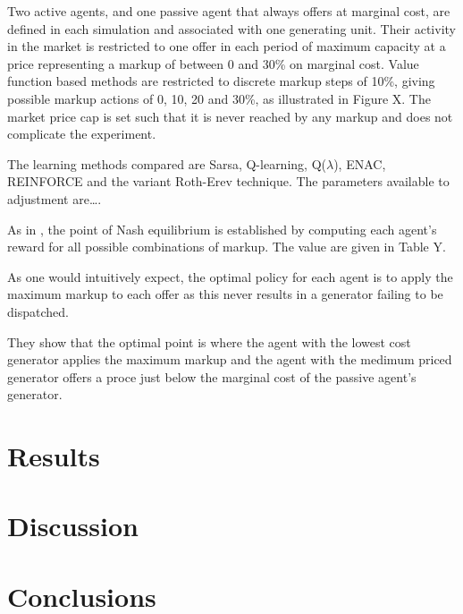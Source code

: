 Two active agents, and one passive agent that always offers at marginal cost,
are defined in each simulation and associated with one generating unit.  Their
activity in the market is restricted to one offer in each period of maximum
capacity at a price representing a markup of between 0 and 30\% on marginal
cost.  Value function based methods are restricted to discrete markup steps of
10\%, giving possible markup actions of 0, 10, 20 and 30\%, as illustrated in
Figure X.  The market price cap is set such that it is never reached by any
markup and does not complicate the experiment.

The learning methods compared are Sarsa, Q-learning, Q($\lambda$), ENAC,
REINFORCE and the variant Roth-Erev technique.  The parameters available to
adjustment are\ldots.

As in , the point of Nash equilibrium is established by
computing each agent's reward for all possible combinations of markup.  The
value are given in Table Y.

As one would intuitively expect, the optimal policy for each agent is to apply
the maximum markup to each offer as this never results in a generator failing
to be dispatched.

They show that the optimal point is where the agent with the lowest cost
generator applies the maximum markup and the agent with the medimum priced
generator offers a proce just below the marginal cost of the passive
agent's generator.


\section{Results}
\section{Discussion}
\section{Conclusions}


